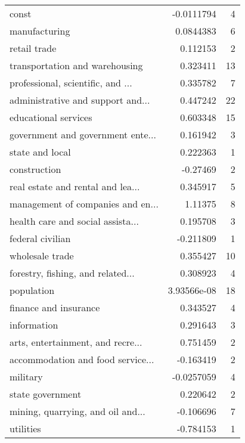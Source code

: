 \begin{tabular}{lrr}
\hline
 const                             & -0.0111794   &  4 \\
 manufacturing                     &  0.0844383   &  6 \\
 retail trade                      &  0.112153    &  2 \\
 transportation and warehousing    &  0.323411    & 13 \\
 professional, scientific, and ... &  0.335782    &  7 \\
 administrative and support and... &  0.447242    & 22 \\
 educational services              &  0.603348    & 15 \\
 government and government ente... &  0.161942    &  3 \\
 state and local                   &  0.222363    &  1 \\
 construction                      & -0.27469     &  2 \\
 real estate and rental and lea... &  0.345917    &  5 \\
 management of companies and en... &  1.11375     &  8 \\
 health care and social assista... &  0.195708    &  3 \\
 federal civilian                  & -0.211809    &  1 \\
 wholesale trade                   &  0.355427    & 10 \\
 forestry, fishing, and related... &  0.308923    &  4 \\
 population                        &  3.93566e-08 & 18 \\
 finance and insurance             &  0.343527    &  4 \\
 information                       &  0.291643    &  3 \\
 arts, entertainment, and recre... &  0.751459    &  2 \\
 accommodation and food service... & -0.163419    &  2 \\
 military                          & -0.0257059   &  4 \\
 state government                  &  0.220642    &  2 \\
 mining, quarrying, and oil and... & -0.106696    &  7 \\
 utilities                         & -0.784153    &  1 \\
\hline
\end{tabular}